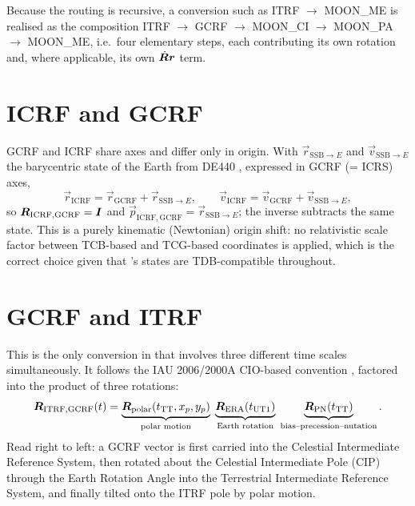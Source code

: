 Because the routing is recursive, a conversion such as ITRF $\to$ MOON\_ME
is realised as the composition
ITRF $\to$ GCRF $\to$ MOON\_CI $\to$ MOON\_PA $\to$ MOON\_ME, i.e.\ four
elementary steps, each contributing its own rotation and, where applicable,
its own $\dot{\bm{R}}\bm{r}$ term.

\section{ICRF and GCRF}
\label{sec:fc-icrf}

GCRF and ICRF share axes and differ only in origin. With
$\vec{r}_{\mathrm{SSB}\to E}$ and $\vec{v}_{\mathrm{SSB}\to E}$ the
barycentric state of the Earth from DE440 \citep{park2021de440}, expressed in
GCRF (= ICRS) axes,
%
\begin{equation}
  \label{eq:fc-icrf}
  \vec{r}_{\mathrm{ICRF}} = \vec{r}_{\mathrm{GCRF}} + \vec{r}_{\mathrm{SSB}\to E},
  \qquad
  \vec{v}_{\mathrm{ICRF}} = \vec{v}_{\mathrm{GCRF}} + \vec{v}_{\mathrm{SSB}\to E},
\end{equation}
%
so $\bm{R}_{\mathrm{ICRF},\mathrm{GCRF}} = \bm{I}$ and
$\vec{p}_{\mathrm{ICRF},\mathrm{GCRF}} = \vec{r}_{\mathrm{SSB}\to E}$; the
inverse subtracts the same state. This is a purely kinematic
(Newtonian) origin shift: no relativistic scale factor between TCB-based and
TCG-based coordinates is applied, which is the correct choice given that
\lupnt{}'s states are TDB-compatible throughout.

\section{GCRF and ITRF}
\label{sec:fc-itrf}

This is the only conversion in \lupnt{} that involves three different time
scales simultaneously. It follows the IAU 2006/2000A CIO-based convention
\citep{iers2010}, factored into the product of three rotations:
%
\begin{equation}
  \label{eq:fc-itrf-chain}
  \bm{R}_{\mathrm{ITRF},\mathrm{GCRF}}(t)
  =
  \underbrace{\bm{R}_{\mathrm{polar}}\!\left(t_{\mathrm{TT}}, x_p, y_p\right)}_{\text{polar motion}}
  \;
  \underbrace{\bm{R}_{\mathrm{ERA}}\!\left(t_{\mathrm{UT1}}\right)}_{\text{Earth rotation}}
  \;
  \underbrace{\bm{R}_{\mathrm{PN}}\!\left(t_{\mathrm{TT}}\right)}_{\text{bias--precession--nutation}} .
\end{equation}
%
Read right to left: a GCRF vector is first carried into the Celestial
Intermediate Reference System, then rotated about the Celestial Intermediate
Pole (CIP) through the Earth Rotation Angle into the Terrestrial
Intermediate Reference System, and finally tilted onto the ITRF pole by
polar motion.

